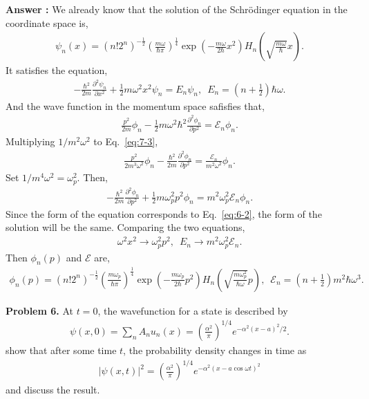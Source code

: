 \documentclass[floatfix,nofootinbib,superscriptaddress,fleqn]{revtex4-2}
\begin{document}
\noindent \textbf{Answer : }
We already know that the solution of the Schr\"odinger equation in the 
coordinate space is,
\begin{align}\label{eq:6-1}
  \psi_n(x)=(n!2^n)^{-\frac{1}{2}}
  \left(\frac{m\omega}{\hbar\pi}\right)^{\frac{1}{4}}
  \exp\left(-\frac{m\omega}{2\hbar}x^2\right)
  H_n\left(\sqrt{\frac{m\omega}{\hbar}}x\right).
\end{align}
It satisfies the equation,
\begin{align}\label{eq:6-2}
  -\frac{\hbar^2}{2m}\frac{\partial^2\psi_n}{\partial x^2}
  +\frac{1}{2}m\omega^2x^2\psi_n = E_n\psi_n,\,\,\,
  E_n = \left(n+\frac{1}{2}\right)\hbar\omega.
\end{align}
And the wave function in the momentum space safisfies that,
\begin{align}\label{eq:6-3}
  \frac{p^2}{2m}\phi_n-\frac{1}{2}m\omega^2\hbar^2
  \frac{\partial^2\phi_n}{\partial p^2} = \mathcal{E}_n\phi_n. 
\end{align}
Multiplying $ 1/{m^2\omega^2}$ to Eq.~\eqref{eq:7-3},
\begin{align}
  \frac{p^2}{2m^3\omega^2}\phi_n-\frac{\hbar^2}{2m}
  \frac{\partial^2\phi_n}{\partial p^2} 
  = \frac{\mathcal{E}_n}{m^2\omega^2}\phi_n. 
\end{align}
Set $1/m^4\omega^2=\omega^2_p$. Then,
\begin{align}
  -\frac{\hbar^2}{2m}\frac{\partial^2\phi_n}{\partial p^2} 
  +\frac{1}{2}m\omega^2_pp^2\phi_n
  = m^2\omega^2_p\mathcal{E}_n\phi_n. 
\end{align}
Since the form of the equation corresponds to Eq.~\eqref{eq:6-2},
the form of the solution will be the same.
Comparing the two equations,
\begin{align}
  \omega^2x^2 \longrightarrow \omega^2_pp^2 ,\,\,\,
  E_n \longrightarrow m^2\omega^2_p\mathcal{E}_n.
\end{align}
Then $\phi_n(p)$ and $\mathcal{E}$ are,
\begin{align}
  \phi_n(p)=(n!2^n)^{-\frac{1}{2}}
  \left(\frac{m\omega_p}{\hbar\pi}\right)^{\frac{1}{4}}
  \exp\left(-\frac{m\omega_p}{2\hbar}p^2\right)
  H_n\left(\sqrt{\frac{m\omega^2_p}{\hbar\omega}}p\right),\,\,\,
  \mathcal{E}_n = \left(n+\frac{1}{2}\right)m^2\hbar\omega^3.
\end{align}
\vspace{1cm}

\noindent \textbf{Problem 6.}
At $t=0$, the wavefunction for a state is described by
\begin{align}
\psi(x,0) = \sum_n A_n u_n(x) =
  \left(\frac{\alpha^2}{\pi}\right)^{1/4} e^{-\alpha^2(x-a)^2/2}  .
\end{align}
show that after some time $t$, the probability density changes in time
as 
\begin{align}
|\psi(x,t)|^2  =  \left(\frac{\alpha^2}{\pi}\right)^{1/4}e^{-\alpha^2
  (x-a\cos\omega t)^2}
\end{align}
and discuss the result. 
\end{document}
